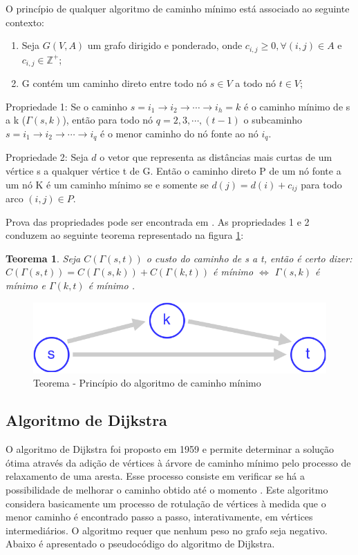 O princípio de qualquer algoritmo de caminho mínimo está associado ao seguinte contexto:
\begin{enumerate}
  \item Seja $G(V,A)$ um grafo dirigido e ponderado, onde $c_{i,j} \geqslant 0, \forall (i,j) \in A$ e $c_{i,j} \in \mathbb{Z}^+$;
  \item G contém um caminho direto entre todo nó $s \in V$ a todo nó $t \in V$;
\end{enumerate}

Propriedade 1: Se o caminho $s=i_1 \rightarrow i_2 \rightarrow \cdots \rightarrow i_h = k$ é o caminho mínimo de s a k ($\Gamma(s,k)$),
então para todo nó $q = 2,3, \cdots, (t-1)$ o subcaminho $s=i_1 \rightarrow i_2 \rightarrow \cdots \rightarrow i_q$ é o menor caminho
do nó fonte ao nó $i_q$.

Propriedade 2: Seja $d$ o vetor que representa as distâncias mais curtas de um vértice s a qualquer vértice t de G. Então o caminho
direto P de um nó fonte a um nó K é um caminho mínimo se e somente se $d(j) = d(i) + c_{ij}$ para todo arco $(i,j) \in P$.

Prova das propriedades pode ser encontrada em \cite{bookahuja}. As propriedades 1 e 2 conduzem ao seguinte teorema representado na
figura \ref{fig:teorema}:

\newtheorem{meuteorema}{Teorema}[chapter]
\begin{meuteorema} \label{teo:Pita} 
Seja $C(\Gamma(s,t))$ o custo do caminho de s a t, então é certo dizer:
$C(\Gamma(s,t)) = C(\Gamma(s,k)) + C(\Gamma(k,t))$ é mínimo $\Longleftrightarrow$ $\Gamma(s,k)$ é mínimo e $\Gamma(k,t)$ é mínimo . 
\end{meuteorema}

\begin{figure}[htbp]
\centering
 \includegraphics[width=.45\textwidth]{chapters/fig/teorema.png}
\caption{Teorema - Princípio do algoritmo de caminho mínimo}
\label{fig:teorema}
\end{figure}
\FloatBarrier

\subsection{Algoritmo de Dijkstra}
O algoritmo de Dijkstra foi proposto em 1959 e permite determinar a solução ótima através da adição de
vértices à árvore de caminho mínimo pelo processo de relaxamento de uma aresta. Esse processo consiste em verificar
se há a possibilidade de melhorar o caminho obtido até o momento \cite{boaventura}. Este algoritmo considera
basicamente um processo de rotulação de vértices à medida que o menor caminho é encontrado passo a passo,
interativamente, em vértices intermediários. O algoritmo requer que nenhum peso no grafo seja negativo. Abaixo
é apresentado o pseudocódigo do algoritmo de Dijkstra.

